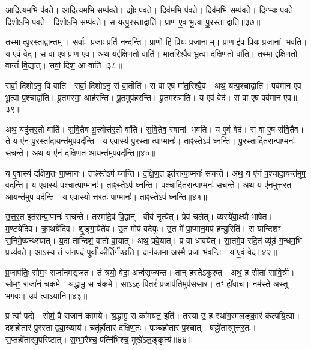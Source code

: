 आ॒दि॒त्यम॒भि प॑वते।
आ॒दि॒त्यम॒भि सम्प॑वते।
द्योः प॑वते।
दिव॑म॒भि प॑वते।
दिव॑म॒भि सम्प॑वते।
दि॒ग्भ्यः प॑वते।
दिशो॒ऽभि प॑वते।
दिशो॒ऽभि सम्प॑वते।
स यत्पु॒रस्ता॒द्वाति॑।
प्रा॒ण ए॒व भू॒त्वा पु॒रस्ताद्वाति॥३७॥

तस्मात्पु॒रस्ता॒द्वान्तम्।
सर्वाः प्र॒जाः प्रति॑ नन्दन्ति।
प्रा॒णो हि प्रि॒यः प्र॒जानाम्।
प्रा॒ण इ॑व प्रि॒यः प्र॒जानां भवति।
य ए॒वं वेद॑।
स वा ए॒ष प्रा॒ण ए॒व।
अथ॒ यद्द॑क्षिण॒तो वाति॑।
मा॒त॒रिश्वै॒व भू॒त्वा द॑क्षिण॒तो वा॑ति।
तस्माद्दक्षिण॒तो वान्तं॑ वि॒द्यात्।
सर्वा॒ दिश॒ आ वा॑ति॥३८॥

सर्वा॒ दिशोऽनु॒ वि वा॑ति।
सर्वा॒ दिशोऽनु॒ सं वा॒तीति॑।
स वा ए॒ष मा॑त॒रिश्वै॒व।
अथ॒ यत्प॒श्चाद्वाति॑।
पव॑मान ए॒व भू॒त्वा प॒श्चाद्वा॑ति।
पू॒तम॑स्मा॒ आह॑रन्ति।
पू॒तमुप॑हरन्ति।
पू॒तम॑श्ञाति।
य ए॒वं वेद॑।
स वा ए॒ष पव॑मान ए॒व॥३९॥

अथ॒ यदु॑त्तर॒तो वाति॑।
स॒वि॒तैव भू॒त्त्वोत्त॑र॒तो वा॑ति।
स॒वि॒तेव॒ स्वानां भवति।
य ए॒वं वेद॑।
स वा ए॒ष स॑वि॒तैव।
ते य ए॑नं पु॒रस्ता॑दा॒यन्त॑मुप॒वद॑न्ति।
य ए॒वास्य॑ पु॒रस्तात्पा॒प्मानः॑।
ताꣴस्तेऽप॑ घ्नन्ति।
पु॒रस्ता॒दित॑रान्पा॒प्मनः॑ सचन्ते।
अथ॒ य ए॑नं दक्षिण॒त आ॒यन्त॑मुप॒वद॑न्ति॥४०॥

य ए॒वास्य॑ दक्षिण॒तः पा॒प्मानः॑।
ताꣴस्तेऽप॑ घ्नन्ति।
द॒क्षि॒ण॒त इत॑रान्पा॒प्मनः॑ सचन्ते।
अथ॒ य ए॑नं प॒श्चादा॒यन्त॑मुप॒ वद॑न्ति।
य ए॒वास्य॑ प॒श्चात्पा॒प्मानः॑।
ताꣴस्तेऽप॑ घ्नन्ति।
प॒श्चादित॑रान्पा॒प्मनः॑ सचन्ते।
अथ॒ य ए॑नमुत्तर॒त आ॒यन्त॑मुप॒ वद॑न्ति।
य ए॒वास्योत्तर॒तः पा॒प्मानः॑।
ताꣴस्तेऽप॑ घ्नन्ति॥४१॥

उ॒त्त॒र॒त इत॑रान्पा॒प्मनः॑ सचन्ते।
तस्मा॑दे॒वं वि॒द्वान्।
वीव॑ नृत्येत्।
प्रेव॑ चलेत्।
व्यस्ये॑वा॒क्ष्यौ भा॑षेत।
म॒ण्टये॑दिव।
क्रा॒थये॑दिव।
शृ॒ङ्गा॒येते॑व।
उ॒त मोप॑ वदेयुः।
उ॒त मे॑ पा॒प्मान॒मप॑ हन्यु॒रिति॑।
स यान्दिशꣳ॑ स॒निमे॒ष्यन्थ्स्यात्।
य॒दा तान्दिशं॒ वातो॑ वा॒यात्।
अथ॒ प्रवे॒यात्।
प्र वा॑ धावयेत्।
सा॒तमे॒व र॑दि॒तं व्यू॑ढं ग॒न्धम॒भि प्रच्य॑वते।
आऽस्य॒ तं ज॑नप॒दं पूर्वा॑ की॒र्तिर्ग॑च्छति।
दान॑कामा अस्मै प्र॒जा भ॑वन्ति।
य ए॒वं वेद॑॥४२॥\anuvakamend[वेद॒ सम्प॑वत आदि॒त्यात्प॑वते वा॒त्या वात्ये॒ष पव॑मान ए॒व द॑क्षिण॒त आ॒यन्त॑मुप॒ वद॑न्त्युत्तर॒तः पा॒प्मान॒स्ताꣳ स्तेप॑ घ्न॒न्तीत्य॒ष्टौ च॑]

प्र॒जाप॑तिः॒ सोम॒ꣳ॒ राजा॑नमसृजत।
तं त्रयो॒ वेदा॒ अन्व॑सृज्यन्त।
तान् हस्ते॑\-ऽकुरुत।
अथ॒ ह सीता॑ सावि॒त्री।
सोम॒ꣳ॒ राजा॑नं चकमे।
श्र॒द्धामु॒ स च॑कमे।
साऽऽह॑ पि॒तरं॑ प्र॒जाप॑ति॒मुप॑ससार।
तꣳ हो॑वाच।
नम॑स्ते अस्तु भगवः।
उप॑ त्वा\-ऽयानि॥४३॥

प्र त्वा॑ पद्ये।
सोमं॒ वै राजा॑नं कामये।
श्र॒द्धामु॒ स का॑मयत॒ इति॑।
तस्या॑ उ॒ ह स्था॑ग॒रम॑लङ्का॒रं क॑ल्पयि॒त्वा।
दश॑होतारं पु॒रस्ताद्व्या॒ख्याय॑।
चतु॑र्\mbox{}होतारं दक्षिण॒तः।
पञ्च॑होतारं प॒श्चात्।
षड्ढो॑तारमुत्तर॒तः।
स॒प्तहो॑तारमु॒परि॑ष्टात्।
स॒म्भा॒रैश्च॒ पत्नि॑भिश्च॒ मुखे॑\-ऽल॒ङ्कृत्य॑॥४४॥

